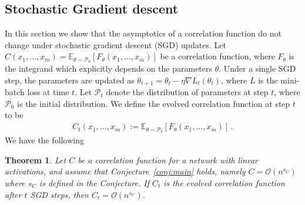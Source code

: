 \documentclass[english]{article}
\newtheorem{thm}{Theorem}
\newcommand{\cO}{\ensuremath{\mathcal{O}}}
\newcommand{\cP}{\ensuremath{\mathcal{P}}}
\newcommand{\lexpp}[1]{\mathbb{E}_{#1}\left[}
\newcommand{\rexp}{\right]}
\begin{document}
\subsection{Stochastic Gradient descent}
In this section we show that the asymptotics of a correlation function do not change under stochastic gradient descent (SGD) updates.
Let $C(x_1,\dots,x_m) = \lexpp{\theta\sim\cP_0} F_\theta(x_1,\dots,x_m) \rexp$ be a correlation function, where $F_\theta$ is the integrand which explicitly depends on the parameters $\theta$.
Under a single SGD step, the parameters are updated as $\theta_{t+1} = \theta_t - \eta \nabla L_t(\theta_t)$, where $L$ is the mini-batch loss at time $t$.
Let $\cP_t$ denote the distribution of parameters at step $t$, where $\cP_0$ is the initial distribution.
We define the evolved correlation function at step $t$ to be
\begin{align}
  C_t(x_1,\dots,x_m) := \lexpp{\theta\sim\cP_t} F_\theta(x_1,\dots,x_m) \rexp \,.
\end{align}
We have the following
\begin{thm} \label{thm:constantScaling}
  Let $C$ be a correlation function for a network with linear activations, and assume that Conjecture~\ref{conj:main} holds, namely $C = \cO(n^{s_C})$ where $s_C$ is defined in the Conjecture.
  If $C_t$ is the evolved correlation function after $t$ SGD steps, then $C_t = \cO(n^{s_C})$.
\end{thm}
\end{document}
